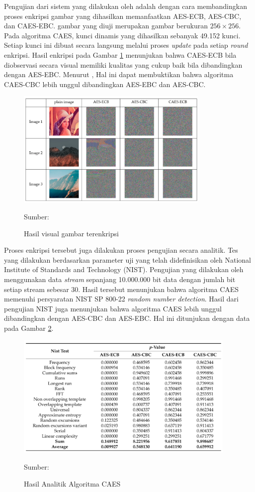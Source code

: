 Pengujian dari sistem yang dilakukan oleh \textcite{lin2021} adalah dengan cara membandingkan proses enkripsi gambar yang dihasilkan memanfaatkan AES-ECB, AES-CBC, dan CAES-EBC. gambar yang diuji merupakan gambar berukuran $256 \times 256$. Pada algoritma CAES, kunci dinamis yang dihasilkan sebanyak 49.152 kunci. Setiap kunci ini dibuat secara langsung melalui proses \emph{update} pada setiap \emph{round} enkripsi. Hasil enkripsi pada Gambar \ref{fig:lin.result} menunjukan bahwa CAES-ECB bila diobservasi secara visual memiliki kualitas yang cukup baik bila dibandingkan dengan AES-EBC. Menurut \textcite{lin2021}, Hal ini dapat membuktikan bahwa algoritma CAES-CBC lebih unggul dibandingkan AES-EBC dan AES-CBC.

\begin{figure}[!h]
  \centering
  \includegraphics[width=350px]{chapters/res/chapter-2/img/lin.res.png}
  \caption{Hasil visual gambar terenkripsi} \label{fig:lin.result}
  Sumber: \textcite{lin2021}
\end{figure}

Proses enkripsi tersebut juga dilakukan proses pengujian secara analitik. Tes yang dilakukan berdasarkan parameter uji yang telah didefinisikan oleh National Institute of Standards and Technology (NIST). Pengujian yang dilakukan oleh \textcite{lin2021} menggunakan data \emph{stream} sepanjang 10.000.000 bit data dengan jumlah bit setiap stream sebesar 30. Hasil tersebut menunjukan bahwa algoritma CAES memenuhi persyaratan NIST SP 800-22 \emph{random number detection}. Hasil dari pengujian NIST juga menunjukan bahwa algoritma CAES lebih unggul dibandingkan dengan AES-CBC dan AES-EBC. Hal ini ditunjukan dengan data pada Gambar \ref{fig:lin.analytic-result}.

\begin{figure}[!h]
  \centering
  \includegraphics[width=400px]{chapters/res/chapter-2/img/lin.analytic-test.png}
  \caption{Hasil Analitik Algoritma CAES} \label{fig:lin.analytic-result}
  Sumber: \textcite{lin2021}
\end{figure}

